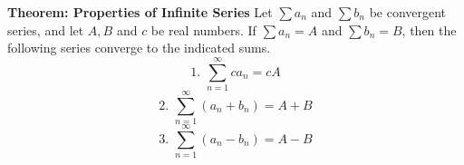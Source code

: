 \nopagenumbers
{\bf Theorem: Properties of Infinite Series}
\vskip 6pt
Let $\sum a_n$ and $\sum b_n$ be convergent series, and let $A,B$ and $c$ be real numbers. If $\sum a_n=A$ and $\sum b_n=B$, then the following series converge to the indicated sums.
\vskip 6pt
$$1.\,\, \sum_{n=1}^\infty ca_n=cA$$
\vskip 1pt
$$2. \,\, \sum_{n=1}^\infty (a_n+b_n)=A+B$$
\vskip 2mm
$$3. \,\,\sum_{n=1}^\infty (a_n-b_n)=A-B$$
\vfill\eject
